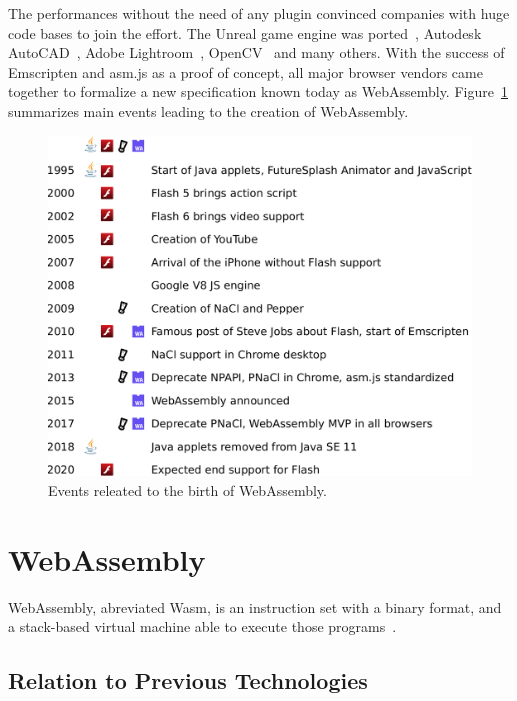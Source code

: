 

The performances without the need of any plugin convinced companies with huge
code bases to join the effort.
The Unreal game engine was ported~\cite{unrealweb},
Autodesk AutoCAD~\cite{autocadweb},
Adobe Lightroom~\cite{lightroomweb},
OpenCV~\cite{taheri2018opencv} and many others.
With the success of Emscripten and asm.js as a proof of concept,
all major browser vendors came together to formalize a new specification
known today as WebAssembly.
Figure~\ref{fig:wasm-timeline} summarizes main events leading to the creation of WebAssembly.

\begin{figure}[h]
	\centering
	\includegraphics[width=\linewidth]{assets/img/wasm-timeline.pdf}
	\caption{Events releated to the birth of WebAssembly.}%
	\label{fig:wasm-timeline}
\end{figure}

\section{WebAssembly}%
\label{sec:WebAssembly}

WebAssembly, abreviated Wasm, is an instruction set with a binary format,
and a stack-based virtual machine able to execute those programs~\cite{haas2017bringing}.

\subsection{Relation to Previous Technologies}%
\label{sub:wasm_previous}

